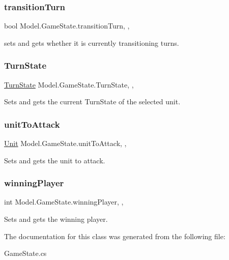 \subsubsection{\texorpdfstring{transition\+Turn}{transitionTurn}}
{\footnotesize\ttfamily bool Model.\+Game\+State.\+transition\+Turn\hspace{0.3cm}{\ttfamily [static]}, {\ttfamily [get]}, {\ttfamily [set]}}

sets and gets whether it is currently transitioning turns. \hypertarget{class_model_1_1_game_state_a07052b158febe5c1f05a6b8bc3426775}{}\label{class_model_1_1_game_state_a07052b158febe5c1f05a6b8bc3426775} 
\subsubsection{\texorpdfstring{Turn\+State}{TurnState}}
{\footnotesize\ttfamily \hyperlink{namespace_model_abc9786019e8deab9844b28c3d9c58f86}{Turn\+State} Model.\+Game\+State.\+Turn\+State\hspace{0.3cm}{\ttfamily [static]}, {\ttfamily [get]}, {\ttfamily [set]}}

Sets and gets the current Turn\+State of the selected unit. \hypertarget{class_model_1_1_game_state_af352baaca46aaf95b984980ca55693ed}{}\label{class_model_1_1_game_state_af352baaca46aaf95b984980ca55693ed} 
\subsubsection{\texorpdfstring{unit\+To\+Attack}{unitToAttack}}
{\footnotesize\ttfamily \hyperlink{interface_model_1_1_unit_module_1_1_unit}{Unit} Model.\+Game\+State.\+unit\+To\+Attack\hspace{0.3cm}{\ttfamily [static]}, {\ttfamily [get]}, {\ttfamily [set]}}

Sets and gets the unit to attack. \hypertarget{class_model_1_1_game_state_a87cc1bbbd0fef930a435e4ac2d941bfd}{}\label{class_model_1_1_game_state_a87cc1bbbd0fef930a435e4ac2d941bfd} 
\subsubsection{\texorpdfstring{winning\+Player}{winningPlayer}}
{\footnotesize\ttfamily int Model.\+Game\+State.\+winning\+Player\hspace{0.3cm}{\ttfamily [static]}, {\ttfamily [get]}, {\ttfamily [set]}}

Sets and gets the winning player. 

The documentation for this class was generated from the following file\+:\begin{DoxyCompactItemize}
\item 
Game\+State.\+cs\end{DoxyCompactItemize}
